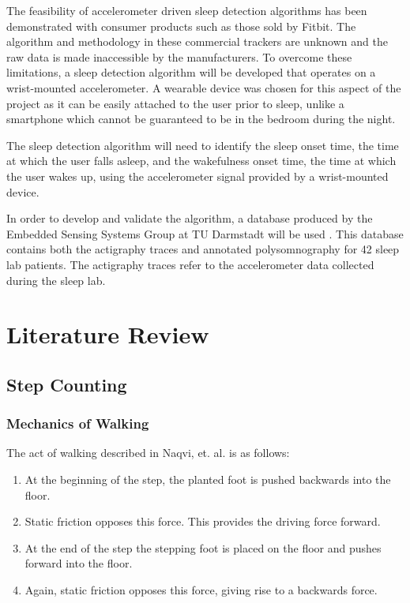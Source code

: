             The feasibility of accelerometer driven sleep detection algorithms has been demonstrated with consumer products such as those sold by Fitbit. The algorithm and methodology in these commercial trackers are unknown and the raw data is made inaccessible by the manufacturers. To overcome these limitations, a sleep detection algorithm will be developed that operates on a wrist-mounted accelerometer. A wearable device was chosen for this aspect of the project as it can be easily attached to the user prior to sleep, unlike a smartphone which cannot be guaranteed to be in the bedroom during the night.

            The sleep detection algorithm will need to identify the sleep onset time, the time at which the user falls asleep, and the wakefulness onset time, the time at which the user wakes up, using the accelerometer signal provided by a wrist-mounted device.

            In order to develop and validate the algorithm, a database produced by the Embedded Sensing Systems Group at TU Darmstadt will be used \cite{database}. This database contains both the actigraphy traces and annotated polysomnography for 42 sleep lab patients. The actigraphy traces refer to the accelerometer data collected during the sleep lab.


    \chapter{Literature Review}


        \section{Step Counting}

            \subsection{Mechanics of Walking}

                The act of walking described in Naqvi, et. al. \cite{navqi} is as follows:

                \begin{enumerate}
                    \item At the beginning of the step, the planted foot is pushed backwards into the floor.
                    \item Static friction opposes this force. This provides the driving force forward.
                    \item At the end of the step the stepping foot is placed on the floor and pushes forward into the floor.
                    \item Again, static friction opposes this force, giving rise to a backwards force.
                \end{enumerate}

